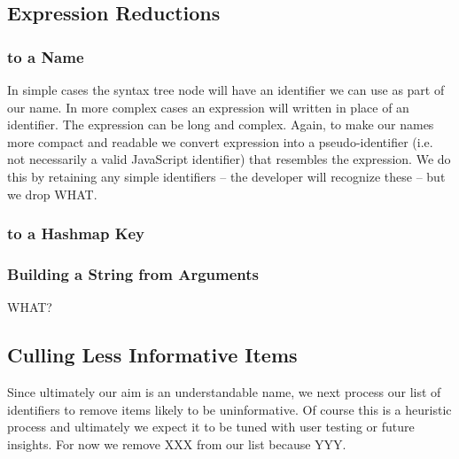 \documentclass[10pt, preprint]{sigplanconf}
\begin{document}


\subsection{Expression Reductions}
\label{sec:general-element-naming}

\subsubsection{to a Name}
In simple cases the syntax tree node will have an identifier we can use as part of our name. In more complex cases an expression will written in place of an identifier. 
The expression can be long and complex. Again, to make our names more compact and readable we convert expression into a pseudo-identifier (i.e. not necessarily
 a valid JavaScript identifier) that resembles the expression. We do this by retaining any simple identifiers -- the developer will recognize these -- but we drop WHAT. 
\subsubsection{to a Hashmap Key} 
 

\subsubsection{Building a String from Arguments}
WHAT?


\subsection{Culling Less Informative Items}
Since ultimately our aim is an understandable name, we next process our list of identifiers to remove items likely to be uninformative. Of course this is a heuristic process and ultimately we expect it to be tuned with user testing or future insights. For now we remove XXX from our list because YYY.
\end{document}
